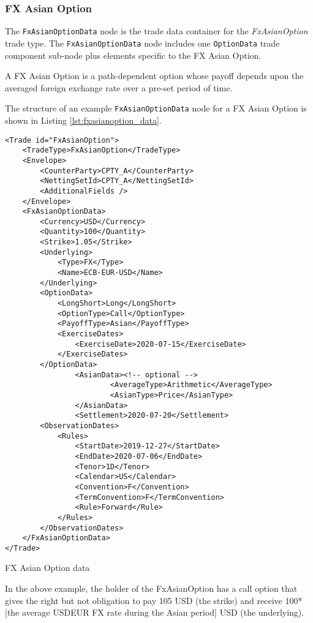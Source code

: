 \subsubsection{FX Asian Option}

The \lstinline!FxAsianOptionData!  node is the trade data container for the \emph{FxAsianOption} trade type. 
The \lstinline!FxAsianOptionData!  node includes one  \lstinline!OptionData! trade component sub-node plus elements
specific to the FX Asian Option. 

A FX Asian Option is a path-dependent option whose payoff depends upon the averaged foreign exchange rate 
over a pre-set period of time.

The structure of an example \lstinline!FxAsianOptionData! node for a FX Asian Option is shown in Listing
\ref{lst:fxasianoption_data}.

\begin{listing}[H]
	\begin{verbatim}
<Trade id="FxAsianOption">
	<TradeType>FxAsianOption</TradeType>
	<Envelope>
		<CounterParty>CPTY_A</CounterParty>
		<NettingSetId>CPTY_A</NettingSetId>
		<AdditionalFields />
	</Envelope>
	<FxAsianOptionData>
		<Currency>USD</Currency>
		<Quantity>100</Quantity>
		<Strike>1.05</Strike>
		<Underlying>
			<Type>FX</Type>
			<Name>ECB-EUR-USD</Name>
		</Underlying>
		<OptionData>
			<LongShort>Long</LongShort>
			<OptionType>Call</OptionType>
			<PayoffType>Asian</PayoffType>
			<ExerciseDates>
				<ExerciseDate>2020-07-15</ExerciseDate>
			</ExerciseDates>
		</OptionData>
                <AsianData><!-- optional -->
                        <AverageType>Arithmetic</AverageType>
                        <AsianType>Price</AsianType>
                </AsianData>
                <Settlement>2020-07-20</Settlement>
		<ObservationDates>
			<Rules>
				<StartDate>2019-12-27</StartDate>
				<EndDate>2020-07-06</EndDate>
				<Tenor>1D</Tenor>
				<Calendar>US</Calendar>
				<Convention>F</Convention>
				<TermConvention>F</TermConvention>
				<Rule>Forward</Rule>
			</Rules>
		</ObservationDates>
	</FxAsianOptionData>
</Trade>
\end{verbatim}
\caption{FX Asian Option data}
\label{lst:fxasianoption_data}
\end{listing}

In the above example, the holder of the FxAsianOption has a call option that gives the right but not obligation to pay 105 USD (the strike) and receive 100*[the average USDEUR FX rate during the Asian period] USD (the underlying).  

